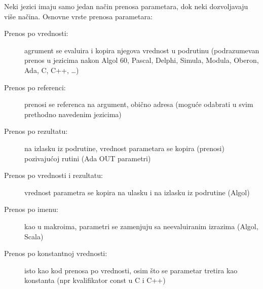 \documentclass[../main.tex]{subfiles}
\begin{document}
Neki jezici imaju samo jedan način prenosa parametara, dok neki dozvoljavaju više načina. Osnovne vrste prenosa parametara:
\begin{description}
\item[Prenos po vrednosti:] agrument se evaluira i kopira njegova vrednost u podrutinu (podrazumevan prenos u jezicima nakon Algol 60, Pascal, Delphi, Simula, Modula, Oberon, Ada, C, C++, \ldots)
\item[Prenos po referenci:] prenosi se referenca na argument, obično adresa (moguće odabrati u svim prethodno navedenim jezicima)
\item[Prenos po rezultatu:] na izlasku iz podrutine, vrednost parametara se kopira (prenosi) pozivajućoj rutini (Ada OUT parametri)
\item[Prenos po vrednosti i rezultatu:] vrednost parametra se kopira na ulasku i na izlasku iz podrutine (Algol)
\item[Prenos po imenu:] kao u makroima, parametri se zamenjuju sa neevaluiranim izrazima (Algol, Scala)
\item[Prenos po konstantnoj vrednosti:] isto kao kod prenosa po vrednosti, osim što se parametar tretira kao konstanta (npr kvalifikator const u C i C++)
\end{description}
\end{document}
